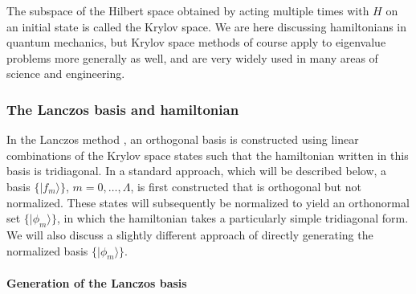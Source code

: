 \documentclass[draft,numberedheadings]{aipproc}
\begin{document}
The subspace of the Hilbert space obtained by acting multiple times with ${H}$ on an initial state is called the Krylov space. We are here discussing 
hamiltonians in quantum mechanics, but Krylov space methods of course apply to eigenvalue problems more generally as well, and are very widely used in 
many areas of science and engineering.

\subsubsection{The Lanczos basis and hamiltonian}
\label{sec_lancbasis}

In the Lanczos method \cite{lanczos52}, an orthogonal basis is constructed using linear combinations of the Krylov space states such that the hamiltonian written in this basis 
is tridiagonal. In a standard approach, which will be described below, a basis $\{ |f_m\rangle\}$, $m=0,\ldots,\Lambda$, is first constructed that is orthogonal 
but not normalized. These states will subsequently be normalized to yield an orthonormal set $\{ |\phi_m\rangle\}$, in which the hamiltonian takes a particularly 
simple tridiagonal form. We will also discuss a slightly different approach of directly generating the normalized basis $\{ |\phi_m\rangle\}$.

\paragraph{Generation of the Lanczos basis}
\end{document}
